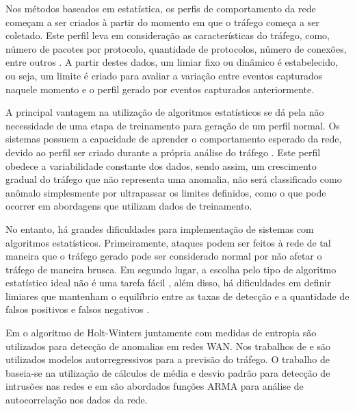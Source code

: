 \indent Nos métodos baseados em estatística, os perfis de comportamento da rede começam a ser criados à partir do momento em que o tráfego começa a ser coletado. Este perfil leva em consideração as características do tráfego, como, número de pacotes por protocolo, quantidade de protocolos, número de conexões, entre outros \cite{perlin2011}. A partir destes dados, um limiar fixo ou dinâmico é estabelecido, ou seja, um limite é criado para avaliar a variação entre eventos capturados naquele momento e o perfil gerado por eventos capturados anteriormente.

\indent A principal vantagem na utilização de algoritmos estatísticos se dá pela não necessidade de uma etapa de treinamento para geração de um perfil normal. Os sistemas possuem a capacidade de aprender o comportamento esperado da rede, devido ao perfil ser criado durante a própria análise do tráfego \cite{Teodoro2009}. Este perfil obedece a variabilidade constante dos dados, sendo assim, um crescimento gradual do tráfego que não representa uma anomalia, não será classificado como anômalo simplesmente por ultrapassar os limites definidos, como o que pode ocorrer em abordagens que utilizam dados de treinamento.

\indent No entanto, há grandes dificuldades para implementação de sistemas com algoritmos estatísticos. Primeiramente, ataques podem ser feitos à rede de tal maneira que o tráfego gerado pode ser considerado normal por não afetar o tráfego de maneira brusca. Em segundo lugar, a escolha pelo tipo de algoritmo estatístico ideal não é uma tarefa fácil , além disso, há dificuldades em definir limiares que mantenham o equilíbrio entre as taxas de detecção e a quantidade de falsos positivos e falsos negativos \cite{Bhuyan}.

\indent Em  o algoritmo de Holt-Winters juntamente com medidas de entropia são utilizados para detecção de anomalias em redes WAN. Nos trabalhos de  e  são utilizados modelos autorregressivos para a previsão do tráfego. O trabalho de  baseia-se na utilização de cálculos de média e desvio padrão para detecção de intrusões nas redes e em  são abordados funções ARMA para análise de autocorrelação nos dados da rede.

